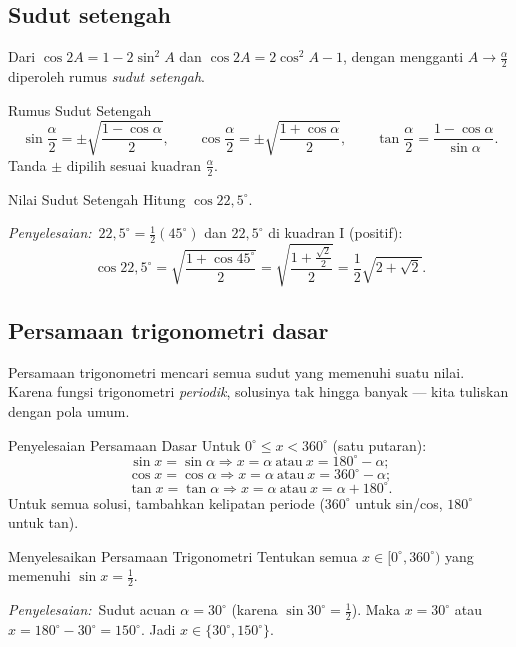 \documentclass[11pt,a4paper]{report}
\theoremstyle{gaya}
\newcommand{\jawab}{\par\smallskip\noindent\textit{\textcolor{oranye}{Penyelesaian:}}\ }
\begin{document}
\subsection*{Sudut setengah}
Dari $\cos2A=1-2\sin^2A$ dan $\cos2A=2\cos^2A-1$, dengan mengganti $A\to\tfrac{\alpha}{2}$ diperoleh rumus \emph{sudut setengah}.

\begin{konsep}{Rumus Sudut Setengah}
\[
\sin\frac{\alpha}{2}=\pm\sqrt{\frac{1-\cos\alpha}{2}},\qquad
\cos\frac{\alpha}{2}=\pm\sqrt{\frac{1+\cos\alpha}{2}},\qquad
\tan\frac{\alpha}{2}=\frac{1-\cos\alpha}{\sin\alpha}.
\]
Tanda $\pm$ dipilih sesuai kuadran $\tfrac{\alpha}{2}$.
\end{konsep}

\begin{contoh}{Nilai Sudut Setengah}
Hitung $\cos22{,}5^\circ$.

\jawab $22{,}5^\circ=\tfrac12(45^\circ)$ dan $22{,}5^\circ$ di kuadran I (positif):
\[
\cos22{,}5^\circ=\sqrt{\frac{1+\cos45^\circ}{2}}=\sqrt{\frac{1+\frac{\sqrt2}{2}}{2}}=\frac12\sqrt{2+\sqrt2}.
\]
\end{contoh}

\subsection*{Persamaan trigonometri dasar}
Persamaan trigonometri mencari semua sudut yang memenuhi suatu nilai. Karena fungsi trigonometri \emph{periodik}, solusinya tak hingga banyak --- kita tuliskan dengan pola umum.

\begin{konsep}{Penyelesaian Persamaan Dasar}
Untuk $0^\circ\le x<360^\circ$ (satu putaran):
\[
\sin x=\sin\alpha \Rightarrow x=\alpha \ \text{atau}\ x=180^\circ-\alpha;
\]
\[
\cos x=\cos\alpha \Rightarrow x=\alpha \ \text{atau}\ x=360^\circ-\alpha;
\]
\[
\tan x=\tan\alpha \Rightarrow x=\alpha \ \text{atau}\ x=\alpha+180^\circ.
\]
Untuk semua solusi, tambahkan kelipatan periode ($360^\circ$ untuk sin/cos, $180^\circ$ untuk tan).
\end{konsep}

\begin{contoh}{Menyelesaikan Persamaan Trigonometri}
Tentukan semua $x\in[0^\circ,360^\circ)$ yang memenuhi $\sin x=\tfrac12$.

\jawab Sudut acuan $\alpha=30^\circ$ (karena $\sin30^\circ=\tfrac12$). Maka $x=30^\circ$ atau $x=180^\circ-30^\circ=150^\circ$. Jadi $x\in\{30^\circ,150^\circ\}$.
\end{contoh}
\end{document}
